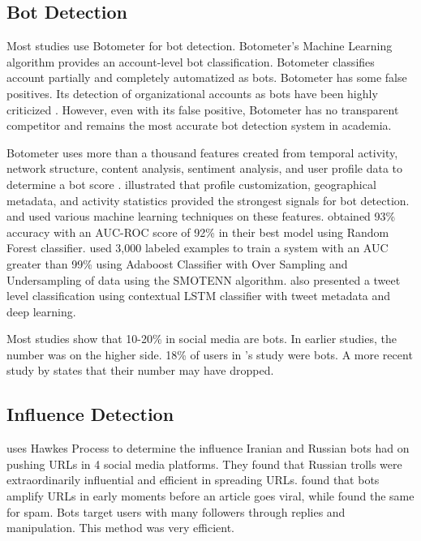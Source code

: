 \documentclass[letterpaper]{article}
\begin{document}
\subsection{Bot Detection}
Most studies \cite{rizoiu2018debatenight,yang2019arming,shao2018spread} use Botometer\cite{davis2016botornot,yang2019arming} for bot detection.
Botometer's Machine Learning algorithm provides an account-level bot classification. Botometer classifies account partially and completely automatized as bots. 
Botometer has some false positives. Its detection of organizational accounts as bots have been highly criticized \cite{varol2017early} \cite{botometer_tweet}. However, even with its false positive, 
Botometer has no transparent competitor and 
remains the most accurate bot detection system in academia. \par

Botometer uses more than a thousand features created from temporal activity, network structure, content analysis, sentiment analysis, and user profile data to
determine a bot score \cite{davis2016botornot,yang2019arming}. \cite{bessi2016social} illustrated that profile customization, geographical metadata, and activity statistics provided the strongest signals for bot detection. \cite{ferrara2017disinformation} and \cite{kudugunta2018deep} used various machine learning techniques on these features. \cite{ferrara2017disinformation}
obtained 93\% accuracy with an AUC-ROC score of 92\% in their best model using Random Forest classifier. \cite{kudugunta2018deep} used 3,000 labeled examples to train a system with an AUC greater than 99\%
using Adaboost Classifier with Over Sampling and Undersampling of data using the SMOTENN algorithm. \cite{kudugunta2018deep} also presented a tweet level classification using contextual LSTM
classifier with tweet metadata and deep learning. \par


Most studies show that 10-20\% in social media are bots. In earlier studies, the number was on the higher side. 18\% of users in \cite{bovet2019influence}'s study were bots.
A more recent study by \cite{deb2019perils} states that their number may have dropped.

\subsection{Influence Detection}
\cite{zannettou2019let} uses Hawkes Process to determine the influence Iranian and Russian bots had on pushing URLs in 4 social media platforms. They found that Russian trolls were extraordinarily 
influential and efficient in spreading URLs. \cite{shao2018spread} found that bots amplify URLs in early moments before an article goes viral, while \cite{ferrara2018measuring} 
found the same for spam. Bots target users with many followers through replies and manipulation. This method was very efficient. \par
\end{document}
